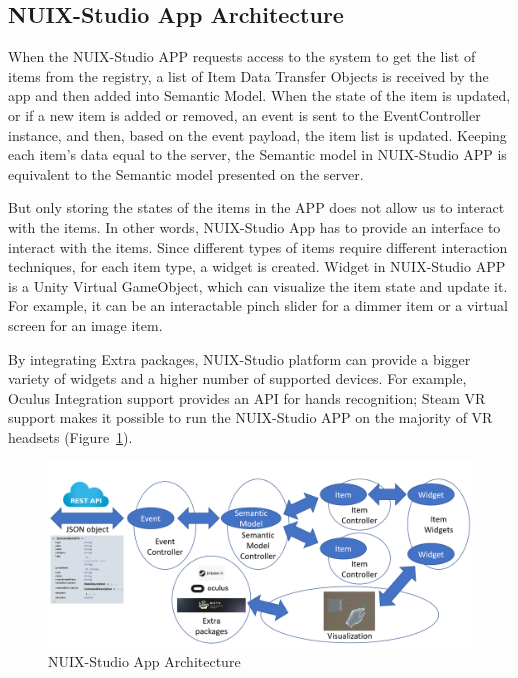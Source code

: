 \subsection{NUIX-Studio App Architecture}

When the NUIX-Studio APP requests access to the system to get the list of items from the registry, a list of Item Data Transfer Objects is received by the app and then added into Semantic Model. When the state of the item is updated, or if a new item is added or removed, an event is sent to the EventController instance, and then, based on the event payload, the item list is updated.  Keeping each item's data equal to the server, the Semantic model in NUIX-Studio APP is equivalent to the Semantic model presented on the server. 

But only storing the states of the items in the APP does not allow us to interact with the items. In other words, NUIX-Studio App has to provide an interface to interact with the items. Since different types of items require different interaction techniques, for each item type, a widget is created.
Widget in NUIX-Studio APP is a Unity Virtual GameObject, which can visualize the item state and update it. For example, it can be an interactable pinch slider for a dimmer item or a virtual screen for an image item.

By integrating Extra packages, NUIX-Studio platform can provide a bigger variety of widgets and a higher number of supported devices. For example, Oculus Integration support provides an API for hands recognition; Steam VR support makes it possible to run the NUIX-Studio APP on the majority of VR headsets (Figure~\ref{fig:AppArchitecture-figure}).

\begin{figure}
  \centering
  \includegraphics[width=0.9\linewidth]{figures/AppArchitecture.png}
  \caption{NUIX-Studio App Architecture}
  \label{fig:AppArchitecture-figure}
\end{figure}

